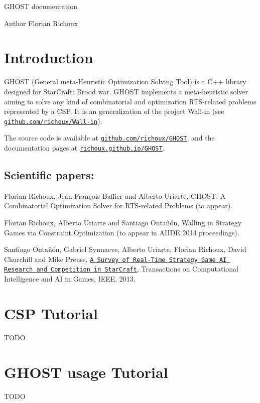 G\-H\-O\-S\-T documentation \begin{DoxyAuthor}{Author}
Florian Richoux
\end{DoxyAuthor}
\section*{Introduction }

G\-H\-O\-S\-T (General meta-\/\-Heuristic Optimization Solving Tool) is a C++ library designed for Star\-Craft\-: Brood war. G\-H\-O\-S\-T implements a meta-\/heuristic solver aiming to solve any kind of combinatorial and optimization R\-T\-S-\/related problems represented by a C\-S\-P. It is an generalization of the project Wall-\/in (see \href{https://github.com/richoux/Wall-in}{\tt github.\-com/richoux/\-Wall-\/in}).

The source code is available at \href{https://github.com/richoux/GHOST}{\tt github.\-com/richoux/\-G\-H\-O\-S\-T}, and the documentation pages at \href{http://richoux.github.io/GHOST}{\tt richoux.\-github.\-io/\-G\-H\-O\-S\-T}.

\subsection*{Scientific papers\-: }


\begin{DoxyItemize}
\item Florian Richoux, Jean-\/\-François Baffier and Alberto Uriarte, G\-H\-O\-S\-T\-: A Combinatorial Optimization Solver for R\-T\-S-\/related Problems (to appear).
\item Florian Richoux, Alberto Uriarte and Santiago Ontañón, Walling in Strategy Games via Constraint Optimization (to appear in A\-I\-I\-D\-E 2014 proceedings).
\item Santiago Ontañón, Gabriel Synnaeve, Alberto Uriarte, Florian Richoux, David Churchill and Mike Preuss, \href{http://pagesperso.lina.univ-nantes.fr/~richoux-f/publications/tciaig13.pdf}{\tt A Survey of Real-\/\-Time Strategy Game A\-I Research and Competition in Star\-Craft}, Transactions on Computational Intelligence and A\-I in Games, I\-E\-E\-E, 2013.
\end{DoxyItemize}

\section*{C\-S\-P Tutorial }

T\-O\-D\-O

\section*{G\-H\-O\-S\-T usage Tutorial }

T\-O\-D\-O 